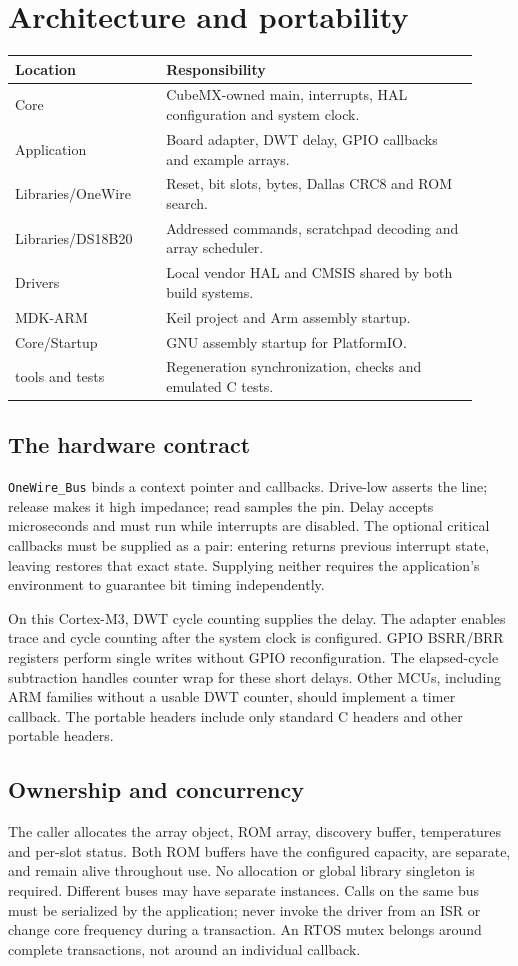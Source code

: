 \section{Architecture and portability}
\begin{tabular}{p{0.30\linewidth}p{0.62\linewidth}}
\toprule Location & Responsibility \\ \midrule
Core & CubeMX-owned main, interrupts, HAL configuration and system clock. \\
Application & Board adapter, DWT delay, GPIO callbacks and example arrays. \\
Libraries/OneWire & Reset, bit slots, bytes, Dallas CRC8 and ROM search. \\
Libraries/DS18B20 & Addressed commands, scratchpad decoding and array scheduler. \\
Drivers & Local vendor HAL and CMSIS shared by both build systems\cite{cubef1}. \\
MDK-ARM & Keil project and Arm assembly startup. \\
Core/Startup & GNU assembly startup for PlatformIO. \\
tools and tests & Regeneration synchronization, checks and emulated C tests. \\
\bottomrule
\end{tabular}

\subsection{The hardware contract}
\texttt{OneWire\_Bus} binds a context pointer and callbacks. Drive-low asserts
the line; release makes it high impedance; read samples the pin. Delay accepts
microseconds and must run while interrupts are disabled. The optional critical
callbacks must be supplied as a pair: entering returns previous interrupt state,
leaving restores that exact state. Supplying neither requires the application's
environment to guarantee bit timing independently.

On this Cortex-M3, DWT cycle counting supplies the delay. The adapter enables
trace and cycle counting after the system clock is configured. GPIO BSRR/BRR
registers perform single writes without GPIO reconfiguration. The elapsed-cycle
subtraction handles counter wrap for these short delays. Other MCUs, including
ARM families without a usable DWT counter, should implement a timer callback.
The portable headers include only standard C headers and other portable headers.

\subsection{Ownership and concurrency}
The caller allocates the array object, ROM array, discovery buffer, temperatures
and per-slot status. Both ROM buffers have the configured capacity, are separate,
and remain alive throughout use. No allocation or global library singleton is
required. Different buses may have separate instances. Calls on the same bus
must be serialized by the application; never invoke the driver from an ISR or
change core frequency during a transaction. An RTOS mutex belongs around complete
transactions, not around an individual callback.
